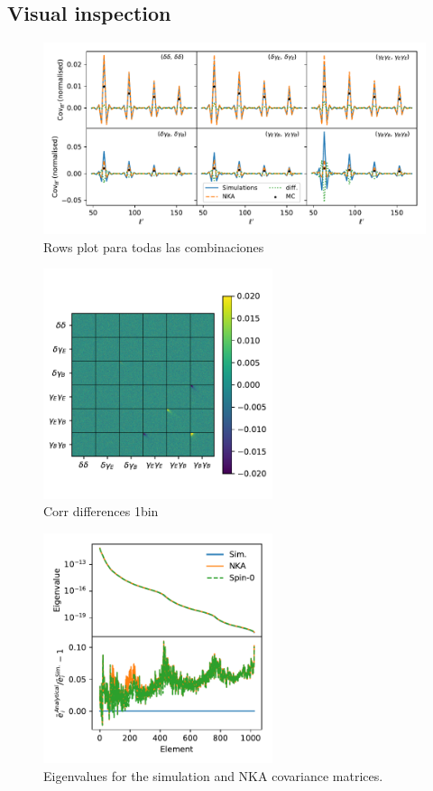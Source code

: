 \documentclass[a4paper,11pt]{article}
\begin{document}
\subsection{Visual inspection}
\begin{figure}[htb]
  \centering
  \includegraphics[width=\textwidth]{./figures/all_rows_sph_1bin.pdf}
  \caption{Rows plot para todas las combinaciones}
  \label{fig:rows_1bin}
\end{figure}

\begin{figure}[htb]
  \centering
  \includegraphics[width=0.6\textwidth]{./figures/sph_1bin_diff_corr.pdf}
  \caption{Corr differences 1bin}
  \label{fig:diff_corr_1bin}
\end{figure}

\begin{figure}[htb]
  \centering
  \includegraphics[width=0.6\textwidth]{./figures/run_sph_2b_NKA_TTTEEE_reldev_eigval_1stbin.pdf}
  \caption{Eigenvalues for the simulation and NKA covariance matrices.}
  \label{fig:eigv_1bin}
\end{figure}
\end{document}
